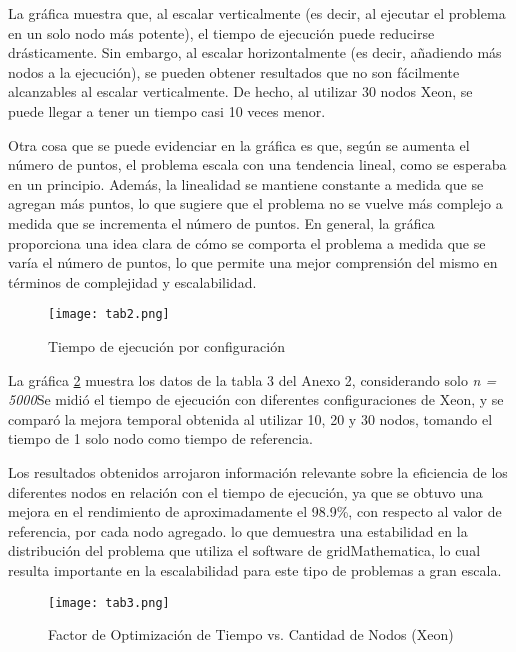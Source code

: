 \begin{spacing}{1.5}
  La gráfica muestra que, al escalar verticalmente (es decir, al ejecutar el problema en un solo nodo más potente), el tiempo de ejecución puede reducirse drásticamente. Sin embargo, al escalar horizontalmente (es decir, añadiendo más nodos a la ejecución), se pueden obtener resultados que no son fácilmente alcanzables al escalar verticalmente. De hecho, al utilizar 30 nodos Xeon, se puede llegar a tener un tiempo casi 10 veces menor.

  Otra cosa que se puede evidenciar en la gráfica es que, según se aumenta el número de puntos, el problema escala con una tendencia lineal, como se esperaba en un principio. Además, la linealidad se mantiene constante a medida que se agregan más puntos, lo que sugiere que el problema no se vuelve más complejo a medida que se incrementa el número de puntos. En general, la gráfica proporciona una idea clara de cómo se comporta el problema a medida que se varía el número de puntos, lo que permite una mejor comprensión del mismo en términos de complejidad y escalabilidad. \newpage

  \begin{figure}[h]
    \centering
    \texttt{[image: tab2.png]}
    \caption{Tiempo de ejecución por configuración}
    \label{fig:etiquetab}
  \end{figure}

  La gráfica \ref{fig:etiquetac} muestra los datos de la tabla 3 del Anexo 2,
  considerando solo \textit{n = 5000}Se midió el tiempo de ejecución con
  diferentes configuraciones de Xeon, y se comparó la mejora temporal
  obtenida al utilizar 10, 20 y 30 nodos, tomando el tiempo de 1 solo nodo
  como tiempo de referencia.

  Los resultados obtenidos arrojaron información relevante sobre la
  eficiencia de los diferentes nodos en relación con el tiempo de ejecución,
  ya que se obtuvo una mejora en el rendimiento de aproximadamente el 98.9\%,
  con respecto al valor de referencia, por cada nodo agregado. lo que
  demuestra una estabilidad en la distribución del problema que utiliza el
  software de gridMathematica, lo cual resulta importante en la
  escalabilidad para este tipo de problemas a gran escala.

  \begin{figure}[h]
    \centering
    \texttt{[image: tab3.png]}
    \caption{Factor de Optimización de Tiempo vs. Cantidad de Nodos (Xeon)}
    \label{fig:etiquetac}
  \end{figure}


\end{spacing}
